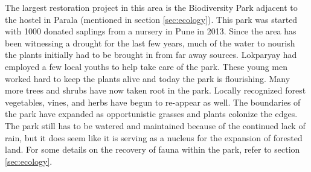 \documentclass[report.tex]{subfiles}
\begin{document}
The largest restoration project in this area is the Biodiversity Park adjacent to the hostel in Parala (mentioned in section \ref{sec:ecology}). This park was started with 1000 donated saplings from a nursery in Pune in 2013. Since the area has been witnessing a drought for the last few years, much of the water to nourish the plants initially had to be brought in from far away sources. Lokparyay had employed a few local youths to help take care of the park. These young men worked hard to keep the plants alive and today the park is flourishing. Many more trees and shrubs have now taken root in the park. Locally recognized forest vegetables, vines, and herbs have begun to re-appear as well. The boundaries of the park have expanded as opportunistic grasses and plants colonize the edges. The park still has to be watered and maintained because of the continued lack of rain, but it does seem like it is serving as a nucleus for the expansion of forested land. For some details on the recovery of fauna within the park, refer to section \ref{sec:ecology}.
\end{document}
